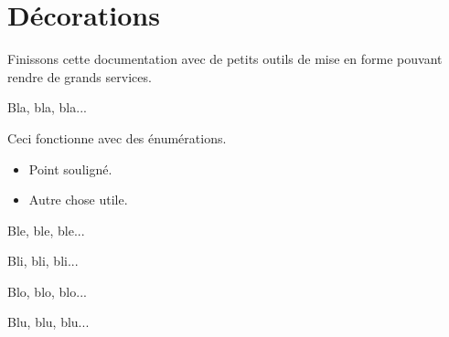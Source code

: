 \documentclass[12pt, a4paper]{article}
\begin{document}
\section{Décorations}

Finissons cette documentation avec de petits outils de mise en forme pouvant rendre de grands services.


\begin{tdoclatex}
Bla, bla, bla...

\tdocsep %

Ceci fonctionne avec des énumérations.

\begin{itemize}
    \item Point souligné.

    \item Autre chose utile.
\end{itemize}

\tdocsep %

Ble, ble, ble...

Bli, bli, bli...

\tdocxspace %

Blo, blo, blo...

Blu, blu, blu...

\end{tdoclatex}
\end{document}
